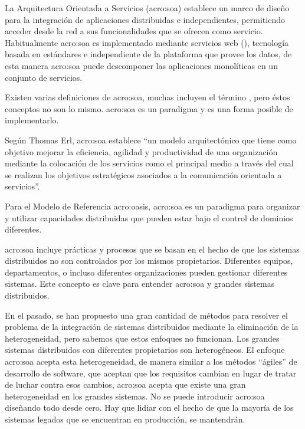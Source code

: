 La Arquitectura Orientada a Servicios (\gls{acro:soa}) establece un marco de diseño para la integración de aplicaciones distribuidas e independientes, permitiendo acceder desde la red a sus funcionalidades que se ofrecen como servicio. Habitualmente \gls{acro:soa} es implementado mediante servicios web (), tecnología basada en estándares e independiente de la plataforma que provee los datos, de esta manera \gls{acro:soa} puede descomponer las aplicaciones monolíticas en un conjunto de servicios\cite{microsoft2006}.

Existen varias definiciones de \gls{acro:soa}, muchas incluyen el término , pero éstos conceptos no son lo mismo. \gls{acro:soa} es un paradigma y  es una forma posible de implementarlo.

Según Thomas Erl\cite{principlesofdesign:erl}, \gls{acro:soa} establece ``un modelo arquitectónico que tiene como objetivo mejorar la eficiencia, agilidad y productividad de una organización mediante la colocación de los servicios como el principal medio a través del cual se realizan los objetivos estratégicos asociados a la comunicación orientada a servicios''.

Para el Modelo de Referencia \gls{acro:oasis}, \gls{acro:soa} es un paradigma para organizar y utilizar capacidades distribuidas que pueden estar bajo el control de dominios diferentes.


\gls{acro:soa} incluye prácticas y procesos que se basan en el hecho de que los sistemas distribuidos no son controlados por los mismos propietarios. Diferentes equipos, departamentos, o incluso diferentes organizaciones pueden gestionar diferentes sistemas. Este concepto es clave para entender \gls{acro:soa} y grandes sistemas distribuidos.

En el pasado, se han propuesto una gran cantidad de métodos para resolver el problema de la integración de sistemas distribuidos mediante la eliminación de la heterogeneidad, pero sabemos que estos enfoques no funcionan. Los grandes sistemas distribuidos con diferentes propietarios son heterogéneos.  El enfoque \gls{acro:soa} acepta esta heterogeneidad, de manera similar a los métodos ``ágiles'' de desarrollo de software, que aceptan que los requisitos cambian en lugar de tratar de luchar contra esos cambios, \gls{acro:soa} acepta que existe una gran heterogeneidad en los grandes sistemas. No se puede introducir \gls{acro:soa} diseñando todo desde cero. Hay que lidiar con el hecho de que la mayoría de los sistemas legados que se encuentran en producción, se mantendrán\cite[p.~15]{josuttis2007}.
